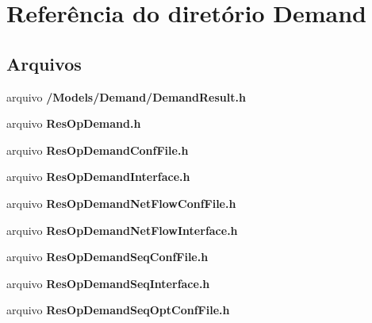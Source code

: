 \section{Referência do diretório Demand}
\label{dir_ec4bb20f1a0da882a8b5149a3ae2f051}
\subsection*{Arquivos}
\begin{DoxyCompactItemize}
\item 
arquivo {\bf /\+Models/\+Demand/\+Demand\+Result.\+h}
\item 
arquivo {\bf Res\+Op\+Demand.\+h}
\item 
arquivo {\bf Res\+Op\+Demand\+Conf\+File.\+h}
\item 
arquivo {\bf Res\+Op\+Demand\+Interface.\+h}
\item 
arquivo {\bf Res\+Op\+Demand\+Net\+Flow\+Conf\+File.\+h}
\item 
arquivo {\bf Res\+Op\+Demand\+Net\+Flow\+Interface.\+h}
\item 
arquivo {\bf Res\+Op\+Demand\+Seq\+Conf\+File.\+h}
\item 
arquivo {\bf Res\+Op\+Demand\+Seq\+Interface.\+h}
\item 
arquivo {\bf Res\+Op\+Demand\+Seq\+Opt\+Conf\+File.\+h}
\end{DoxyCompactItemize}
